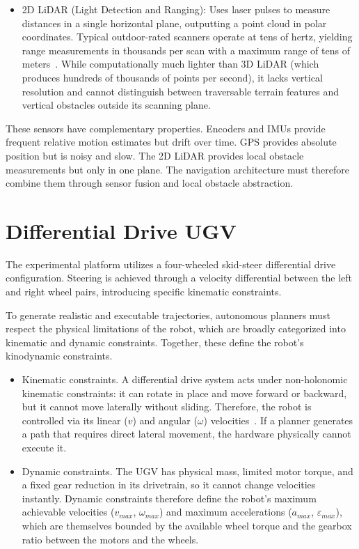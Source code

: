 \begin{itemize}
\item 2D LiDAR (Light Detection and Ranging): Uses laser pulses to measure distances in a single horizontal plane, outputting a point cloud in polar coordinates. Typical outdoor-rated scanners operate at tens of hertz, yielding range measurements in thousands per scan with a maximum range of tens of meters~\cite{hokuyo_utm30lx_ew}. While computationally much lighter than 3D LiDAR (which produces hundreds of thousands of points per second), it lacks vertical resolution and cannot distinguish between traversable terrain features and vertical obstacles outside its scanning plane.
\end{itemize}

These sensors have complementary properties. Encoders and IMUs provide frequent relative motion estimates but drift over time. GPS provides absolute position but is noisy and slow. The 2D LiDAR provides local obstacle measurements but only in one plane. The navigation architecture must therefore combine them through sensor fusion and local obstacle abstraction.

\section{Differential Drive UGV}
\label{sec:differential-drive}

The experimental platform utilizes a four-wheeled skid-steer differential drive configuration. Steering is achieved through a velocity differential between the left and right wheel pairs, introducing specific kinematic constraints.

To generate realistic and executable trajectories, autonomous planners must respect the physical limitations of the robot, which are broadly categorized into kinematic and dynamic constraints. Together, these define the robot's kinodynamic constraints.

\begin{itemize}
    \item Kinematic constraints. A differential drive system acts under non-holonomic kinematic constraints: it can rotate in place and move forward or backward, but it cannot move laterally without sliding. Therefore, the robot is controlled via its linear ($v$) and angular ($\omega$) velocities~\cite{minguez2008motion}. If a planner generates a path that requires direct lateral movement, the hardware physically cannot execute it.
    \item Dynamic constraints. The UGV has physical mass, limited motor torque, and a fixed gear reduction in its drivetrain, so it cannot change velocities instantly. Dynamic constraints therefore define the robot's maximum achievable velocities ($v_{max}$, $\omega_{max}$) and maximum accelerations ($a_{max}$, $\varepsilon_{max}$), which are themselves bounded by the available wheel torque and the gearbox ratio between the motors and the wheels.
\end{itemize}

